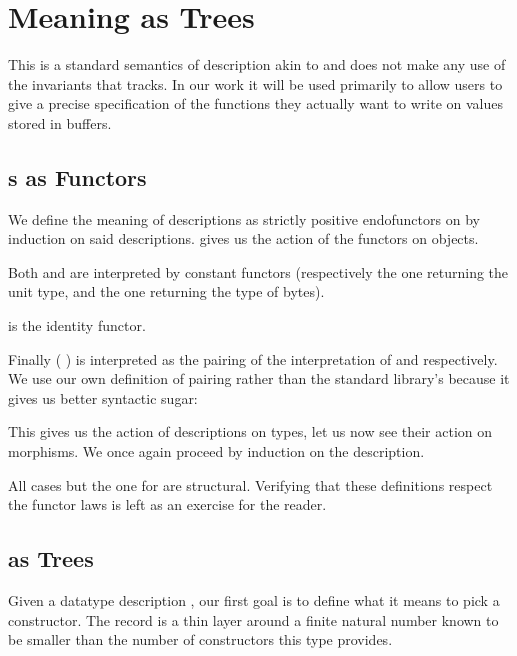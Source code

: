 \section{Meaning as Trees}\label{sec:trees}

This is a standard semantics of description akin to
and does not make any use of the invariants that 
tracks.
%
In our work it will be used primarily to allow users to give
a precise specification of the functions they actually want to
write on values stored in buffers.

\subsection{s as Functors}

We define the meaning of descriptions as strictly positive
endofunctors on  by induction on said descriptions.
%
 gives us the action of the functors on objects.


Both  and  are interpreted by constant
functors (respectively the one returning the unit type, and the one returning
the type of bytes).

 is the identity functor.


Finally (  )
is interpreted as the pairing of the interpretation of
 and  respectively.
We use our own definition of pairing rather than the
standard library's because it gives us better syntactic sugar:


This gives us the action of descriptions on types, let us now
see their action on morphisms.
%
We once again proceed by induction on the description.


All cases but the one for  are structural.
%
Verifying that these definitions respect the functor laws is left as
an exercise for the reader.

\subsection{ as Trees}

Given a datatype description , our first goal is
to define what it means to pick a constructor.
%
The  record is a thin layer around a finite
natural number known to be smaller than the number of constructors
this type provides.


